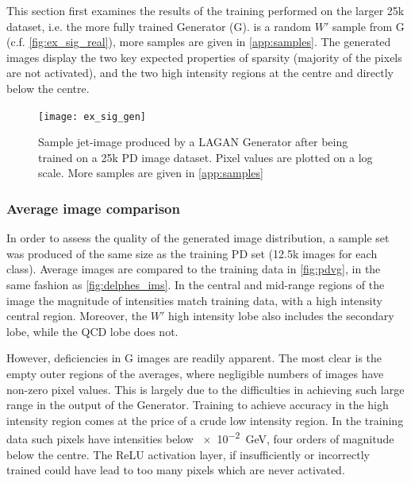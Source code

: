 \documentclass[twocolumn]{article}
\newcommand{\around}{{\raise.17ex\hbox{$\scriptstyle\sim$}}}
\newcommand{\gev}{\giga\electronvolt}
\begin{document}
This section first examines the results of the training performed on the larger 25k dataset, i.e. the more fully trained Generator (G).  is a random $W'$ sample from G (c.f. \cref{fig:ex_sig_real}), more samples are given in \cref{app:samples}. The generated images display the two key expected properties of sparsity (majority of the pixels are not activated), and the two high intensity regions at the centre and directly below the centre.

\begin{figure}[H]
	\centering
	\texttt{[image: ex\_sig\_gen]}
	
	\caption{Sample jet-image produced by a LAGAN Generator after being trained on a 25k PD image dataset. Pixel values are plotted on a log scale. More samples are given in \cref{app:samples}}
	\label{fig:ex_sig_gen}
	
\end{figure}

\subsubsection{Average image comparison}
In order to assess the quality of the generated image distribution, a sample set was produced of the same size as the training PD set (12.5k images for each class). Average images are compared to the training data in \cref{fig:pdvg}, in the same fashion as \cref{fig:delphes_ims}. In the central and mid-range regions of the image the magnitude of intensities match training data, with a high intensity central region. Moreover, the $W'$ high intensity lobe also includes the secondary lobe, while the QCD lobe does not.

However, deficiencies in G images are readily apparent. The most clear is the empty outer regions of the averages, where negligible numbers of images have non-zero pixel values. This is largely due to the difficulties in achieving such large range in the output of the Generator. Training to achieve accuracy in the high intensity region comes at the price of a crude low intensity region. In the training data such pixels have intensities below \SI{e-2}{\gev}, four orders of magnitude below the centre. The ReLU activation layer, if insufficiently or incorrectly trained could have lead to too many pixels which are never activated.
\end{document}
